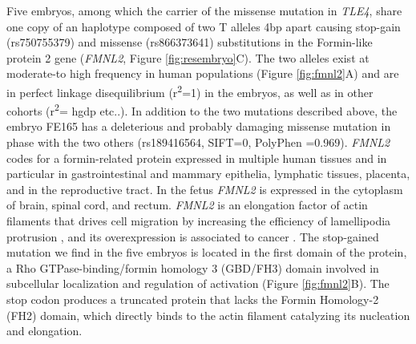 Five embryos, among which the carrier of the missense mutation in \textit{TLE4}, share one copy of an haplotype composed of two T alleles 4bp apart causing stop-gain (rs750755379) and missense (rs866373641) substitutions in the Formin-like protein 2 gene (\textit{FMNL2}, Figure \ref{fig:resembryo}C). The two alleles exist at moderate-to high frequency in human populations (Figure \ref{fig:fmnl2}A) and are in perfect linkage disequilibrium (r\textsuperscript{2}=1) in the embryos, as well as in other cohorts (r\textsuperscript{2}= hgdp etc..). In addition to the two mutations described above, the embryo FE165 has a deleterious and probably damaging missense mutation in phase with the two others (rs189416564, SIFT=0, PolyPhen =0.969). \textit{FMNL2} codes for a formin-related protein expressed in multiple human tissues and in particular in gastrointestinal and mammary epithelia, lymphatic tissues, placenta, and in the reproductive tract\cite{gardberg2010characterization}. In the fetus \textit{FMNL2} is expressed in the cytoplasm of brain, spinal cord, and rectum\cite{lizio2015gateways}. \textit{FMNL2} is an elongation factor of actin filaments that drives cell migration by increasing the efficiency of lamellipodia protrusion \cite{block2012fmnl2, kuhn2015structure}, and its overexpression is associated to cancer \cite{zhu2011fmnl2}. The stop-gained mutation we find in the five embryos is located in the first domain of the protein, a Rho GTPase-binding/formin homology 3 (GBD/FH3) domain involved in subcellular localization and regulation of activation (Figure \ref{fig:fmnl2}B). The stop codon produces a truncated protein that lacks the Formin Homology-2 (FH2) domain, which directly binds to the actin filament catalyzing its nucleation and elongation.